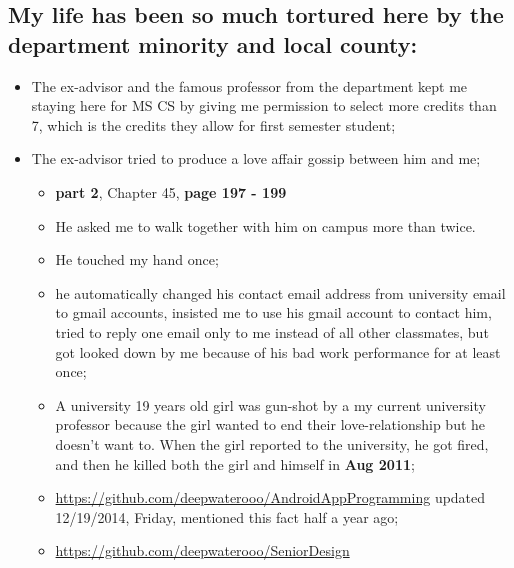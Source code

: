 \documentclass[9pt,b5paper]{article}
\begin{document}
\subsection{My life has been so much \textbf{tortured} here by the department minority and local county:}
\label{sec-2-1}
\begin{itemize}
\item The ex-advisor and the famous professor from the department kept me staying here for MS CS by giving me permission to select more credits than 7, which is the credits they allow for first semester student;
\item The ex-advisor tried to produce a love affair gossip between him and me;
\begin{itemize}
\item \textbf{part 2}, Chapter 45, \textbf{page 197 - 199}
\item He asked me to walk together with him on campus more than twice.
\item He touched my hand once;
\item he automatically changed his contact email address from university email to gmail accounts, insisted me to use his gmail account to contact him, tried to reply one email only to me instead of all other classmates, but got looked down by me because of his bad work performance for at least once;
\item A university 19 years old girl was gun-shot by a my current university professor because the girl wanted to end their love-relationship but he doesn't want to. When the girl reported to the university, he got fired, and then he killed both the girl and himself in \textbf{Aug 2011};
\item \url{https://github.com/deepwaterooo/AndroidAppProgramming} updated 12/19/2014, Friday, mentioned this fact half a year ago;
\item \url{https://github.com/deepwaterooo/SeniorDesign}
\end{itemize}
\end{itemize}
\end{document}
